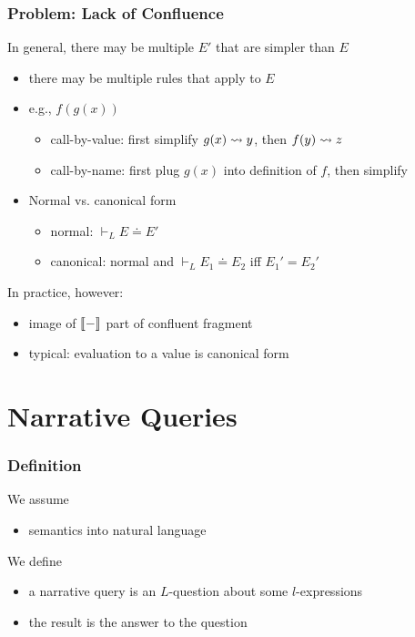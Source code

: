 \begin{frame}\frametitle{Problem: Lack of Confluence}
In general, there may be multiple $E'$ that are simpler than $E$
\begin{itemize}
 \item there may be multiple rules that apply to $E$
 \item e.g., $f(g(x))$
  \begin{itemize}
  \item call-by-value: first simplify $g(x)\rightsquigarrow y$, then $f(y)\rightsquigarrow z$
  \item call-by-name: first plug $g(x)$ into definition of $f$, then simplify
  \end{itemize}
\item Normal vs. canonical form
 \begin{itemize}
 \item normal: $\vdash_L E\doteq E'$
 \item canonical: normal and $\vdash_L E_1\doteq E_2$ iff $E_1'=E_2'$
 \end{itemize}
\end{itemize}

In practice, however:
\begin{itemize}
\item image of $\llbracket -\rrbracket$ part of confluent fragment
\item typical: evaluation to a value is canonical form
\end{itemize}
\end{frame}

\section{Narrative Queries}

\begin{frame}\frametitle{Definition}
We assume
\begin{itemize}
\item semantics into natural language
\end{itemize}

We define
\begin{itemize}
\item a narrative query is an $L$-question about some $l$-expressions
\item the result is the answer to the question
\end{itemize}
\end{frame}

